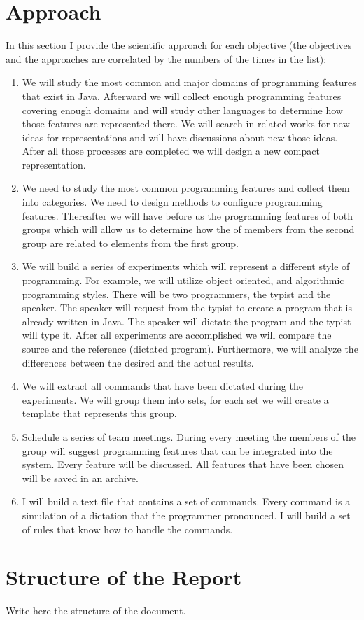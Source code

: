 \section{Approach}
In this section I provide the scientific approach for each objective (the objectives and the approaches are correlated by the numbers of the times in the list):
\begin{enumerate}
	\item We will study the most common and major domains of programming features that exist in Java. Afterward we will collect enough programming features covering enough domains and will study other languages to determine how those features are represented there. We will search in related works for new ideas for representations and will have discussions about new those ideas. After all those processes are completed we will design a new compact representation.
	\item We need to study the most common programming features and collect them into categories. We need to design methods to configure programming features. Thereafter we will have before us the programming features of both groups which will allow us to determine how the of members from the second group are related to  elements from the first group.
	\item We will build a series of experiments which will represent a different style of programming. For example, we will utilize object oriented, and algorithmic programming styles. There will be two programmers, the typist and the speaker. The speaker will request from the typist to create a program that is already written in Java. The speaker will dictate the program and the typist will type it. After all experiments are accomplished we will compare the source and the reference (dictated program). Furthermore, we will analyze the differences between the desired and the actual results.
	\item We will extract all commands that have been dictated during the experiments. We will group them into sets, for each set we will create a template that represents this group.
	\item Schedule a series of team meetings. During every meeting the members of the group will suggest programming features that can be integrated into the system. Every feature will be discussed. All features that have been chosen will be saved in an archive.
	\item I will build a text file that contains a set of commands. Every command is a simulation of a dictation that the programmer pronounced. I will build a set of rules that know how to handle the commands.
\end{enumerate}
\section{Structure of the Report}
\begin{remark}
Write here the structure of the document.
\end{remark}